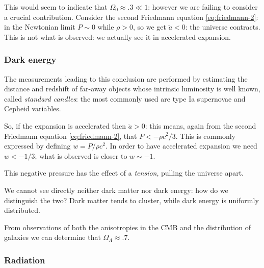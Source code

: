 \documentclass[main.tex]{subfiles}
\begin{document}
This would seem to indicate that \(\Omega_{0} \approx \num{.3} \ll 1\): however we are failing to consider a crucial contribution.
Consider the second Friedmann equation \eqref{eq:friedmann-2}: in the Newtonian limit \(P \sim 0\) while \( \rho >0 \), so we get \(\ddot{a} <0\): the universe contracts.
This is not what is observed: we actually see it in accelerated expansion.

\subsubsection{Dark energy}

The measurements leading to this conclusion are performed by estimating the distance and redshift of far-away objects whose intrinsic luminosity is well known, called \emph{standard candles}: the most commonly used are type Ia supernovae and Cepheid variables.

So, if the expansion is accelerated then \(\ddot{a} > 0\): this means, again from the second Friedmann equation \eqref{eq:friedmann-2}, that \(P < -\rho c^2/3\).
This is commonly expressed by defining \(w = P / \rho c^2\). 
In order to have accelerated expansion we need \(w < -1/3\); what is observed is closer to \(w \sim -1\).

This negative pressure has the effect of a \emph{tension}, pulling the universe apart.


We cannot see directly neither dark matter nor dark energy: how do we distinguish the two? Dark matter tends to cluster, while dark energy is uniformly distributed.

From observations of both the anisotropies in the CMB and the distribution of galaxies we can determine that \(\Omega_{\Lambda } \approx \num{.7}\).


\subsubsection{Radiation}
\end{document}
